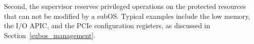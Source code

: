 \documentclass[pageno]{jpaper}
\begin{document}
Second, the supervisor reserves privileged operations on the protected
resources that can not be modified by a subOS. Typical examples include the low memory, the I/O APIC, and the PCIe configuration registers, as discussed in Section~\ref{subos_management}.
\end{document}
